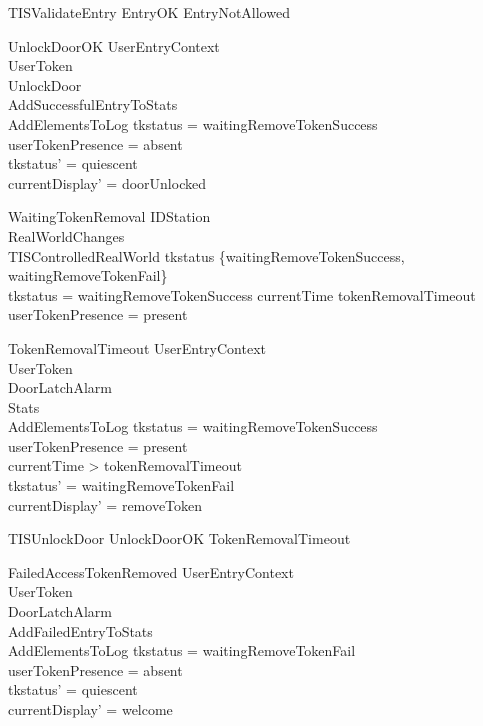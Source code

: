 \begin{zed}
TISValidateEntry  EntryOK \lor  EntryNotAllowed \lor  [UserTokenTorn | tkstatus = waitingEntry]
\end{zed}

\begin{schema}{UnlockDoorOK}
  UserEntryContext\\
  \Xi UserToken\\
  UnlockDoor\\
  AddSuccessfulEntryToStats\\
  AddElementsToLog
\where
  tkstatus = waitingRemoveTokenSuccess\\
  userTokenPresence = absent\\
  tkstatus' = quiescent\\
  currentDisplay' = doorUnlocked
\end{schema}

\begin{schema}{WaitingTokenRemoval}
  \Xi IDStation\\
  RealWorldChanges\\
  \Xi TISControlledRealWorld
\where
  tkstatus \in  \{waitingRemoveTokenSuccess, waitingRemoveTokenFail\}\\
  tkstatus = waitingRemoveTokenSuccess \implies  currentTime \leq  tokenRemovalTimeout\\
  userTokenPresence = present
\end{schema}

\begin{schema}{TokenRemovalTimeout}
  UserEntryContext\\
  \Xi UserToken\\
  \Xi DoorLatchAlarm\\
  \Xi Stats\\
  AddElementsToLog
\where
  tkstatus = waitingRemoveTokenSuccess\\
  userTokenPresence = present\\
  currentTime > tokenRemovalTimeout\\
  tkstatus' = waitingRemoveTokenFail\\
  currentDisplay' = removeToken
\end{schema}

\begin{zed}
TISUnlockDoor  UnlockDoorOK \lor  [WaitingTokenRemoval | tkstatus = waitingRemoveTokenSuccess] \lor  TokenRemovalTimeout
\end{zed}

\begin{schema}{FailedAccessTokenRemoved}
  UserEntryContext\\
  \Xi UserToken\\
  \Xi DoorLatchAlarm\\
  AddFailedEntryToStats\\
  AddElementsToLog
\where
  tkstatus = waitingRemoveTokenFail\\
  userTokenPresence = absent\\
  tkstatus' = quiescent\\
  currentDisplay' = welcome
\end{schema}

